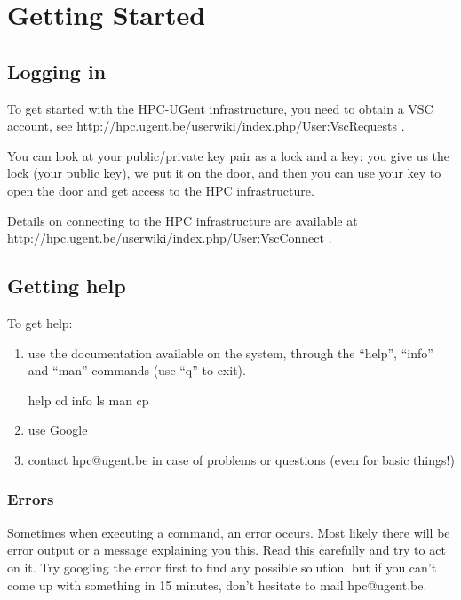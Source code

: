 \chapter{Getting Started}

\section{Logging in}

To get started with the HPC-UGent infrastructure, you need to obtain a VSC
account, see http://hpc.ugent.be/userwiki/index.php/User:VscRequests .


You can look at your public/private key pair as a lock and a key: you give us
the lock (your public key), we put it on the door, and then you can use your
key to open the door and get access to the HPC infrastructure. 

Details on connecting to the HPC infrastructure are available at
http://hpc.ugent.be/userwiki/index.php/User:VscConnect .

\section{Getting help}

To get help:

\begin{enumerate}
  \item use the documentation available on the system, through the ``help'',
    ``info'' and ``man'' commands (use ``q'' to exit).

\begin{prompt}
  help cd
  info ls
  man cp
\end{prompt}

  \item use Google
  \item contact hpc@ugent.be in case of problems or questions (even for basic
    things!)
\end{enumerate}

\subsection{Errors}

Sometimes when executing a command, an error occurs. Most likely there will be
error output or a message explaining you this. Read this carefully and try to
act on it. Try googling the error first to find any possible solution, but if
you can't come up with something in 15 minutes, don't hesitate to mail
hpc@ugent.be.


